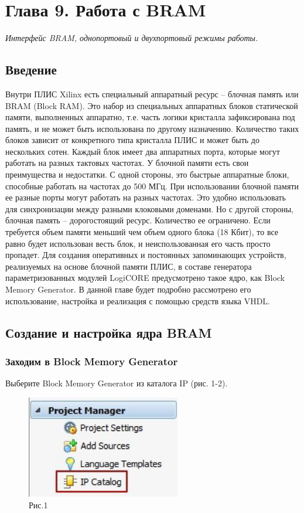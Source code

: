 \chapter*{Глава 9. Работа с BRAM}

\emph{Интерфейс BRAM, однопортовый и двухпортовый режимы работы.}

\section{Введение}

Внутри ПЛИС Xilinx есть специальный аппаратный ресурс – блочная память или BRAM (Block RAM). Это набор из специальных аппаратных блоков статической памяти, выполненных аппаратно, т.е. часть логики кристалла зафиксирована под память, и не может быть использована по другому назначению. Количество таких блоков зависит от конкретного типа кристалла ПЛИС и может быть до нескольких сотен. Каждый блок имеет два аппаратных порта, которые могут работать на разных тактовых частотах. 
У блочной памяти есть свои преимущества и недостатки. С одной стороны, это быстрые аппаратные блоки, способные работать на частотах до 500 МГц. При использовании блочной памяти ее разные порты могут работать на разных частотах. Это удобно использовать для синхронизации между разными клоковыми доменами. Но с другой стороны, блочная память – дорогостоящий ресурс. Количество ее ограничено. Если требуется объем памяти меньший чем объем одного блока (18 Кбит), то все равно будет использован весть блок, и неиспользованная его часть просто пропадет. 
Для создания оперативных и постоянных запоминающих устройств, реализуемых на основе блочной памяти ПЛИС, в составе генератора параметризованных модулей LogiCORE предусмотрено такое ядро, как Block Memory Generator. В данной главе будет подробно рассмотрено его использование, настройка и реализация с помощью средств языка VHDL.

\section{Создание и настройка ядра BRAM}

\subsection{Заходим в Block Memory Generator} 
Выберите Block Memory Generator из каталога IP (рис. 1-2).

\begin{figure}[H]
\centering
\includegraphics[width=0.6\textwidth]{1}
\caption{Рис.1}
\label{1_label}
\end{figure}

